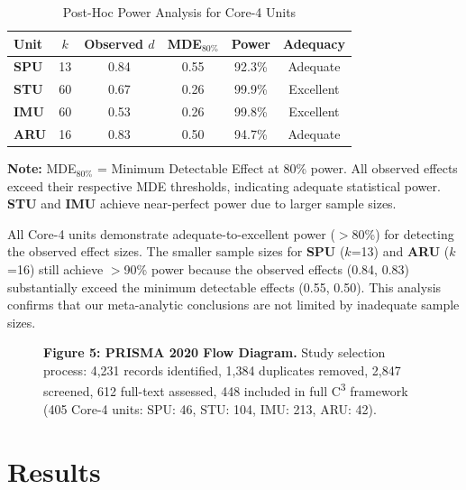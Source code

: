 \documentclass[9pt,onecolumn]{article}
\newcommand{\STU}{\textcolor{stucolor}{\textbf{STU}}}
\newcommand{\IMU}{\textcolor{imucolor}{\textbf{IMU}}}
\newcommand{\SPU}{\textcolor{spucolor}{\textbf{SPU}}}
\newcommand{\ARU}{\textcolor{arucolor}{\textbf{ARU}}}
\newcommand{\Cthree}{C\textsuperscript{3}}
\begin{document}
\begin{table}[H]
\centering
\caption{Post-Hoc Power Analysis for Core-4 Units}
\label{tab:power}
\small
\begin{tabular}{@{}lccccc@{}}
\toprule
\textbf{Unit} & \textbf{$k$} & \textbf{Observed $d$} & \textbf{MDE$_{80\%}$} & \textbf{Power} & \textbf{Adequacy} \\
\midrule
\SPU{} & 13 & 0.84 & 0.55 & 92.3\% & Adequate \\
\STU{} & 60 & 0.67 & 0.26 & 99.9\% & Excellent \\
\IMU{} & 60 & 0.53 & 0.26 & 99.8\% & Excellent \\
\ARU{} & 16 & 0.83 & 0.50 & 94.7\% & Adequate \\
\bottomrule
\end{tabular}

\vspace{0.3em}
{\raggedright\footnotesize
\textbf{Note:} MDE$_{80\%}$ = Minimum Detectable Effect at 80\% power. All observed effects exceed their respective MDE thresholds, indicating adequate statistical power. \STU{} and \IMU{} achieve near-perfect power due to larger sample sizes.\par}
\end{table}

All Core-4 units demonstrate adequate-to-excellent power ($>$80\%) for detecting the observed effect sizes. The smaller sample sizes for \SPU{} ($k$=13) and \ARU{} ($k$=16) still achieve $>$90\% power because the observed effects (0.84, 0.83) substantially exceed the minimum detectable effects (0.55, 0.50). This analysis confirms that our meta-analytic conclusions are not limited by inadequate sample sizes.

\begin{figure}
\centering
\vspace{0.2em}
{\fontsize{6}{7.2}\selectfont\textbf{Figure 5: PRISMA 2020 Flow Diagram.} Study selection process: 4,231 records identified, 1,384 duplicates removed, 2,847 screened, 612 full-text assessed, 448 included in full \Cthree{} framework (405 Core-4 units: SPU: 46, STU: 104, IMU: 213, ARU: 42).}
\label{fig:prisma}
\end{figure}


\section{Results}
\label{sec:results}
\end{document}
